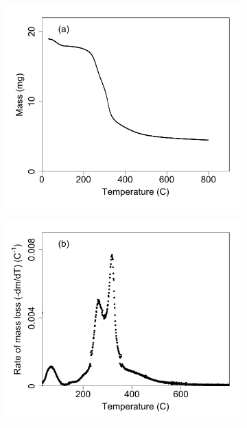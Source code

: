 \documentclass{article}
\begin{document}
\begin{figure}
\centering
	\begin{subfigure}[!ht]{0.3\textwidth}
		\includegraphics[width=\textwidth]{figs/TG.png}
	\end{subfigure}\hfill
	\begin{subfigure}[!ht]{0.3\textwidth}
		\includegraphics[width=\textwidth]{figs/DTG.png}
	\end{subfigure}\hfill

\end{figure}
\end{document}
